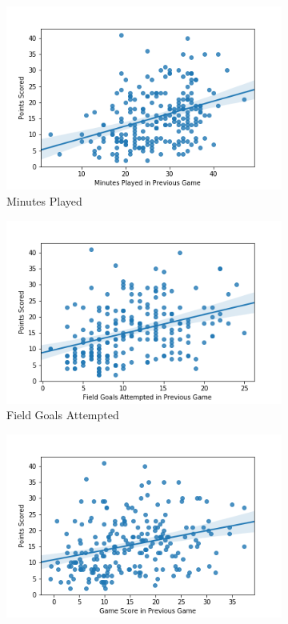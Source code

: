 \documentclass[a4paper,11pt,twoside]{article}
\begin{document}
\begin{figure} [h!]
\centering
  \begin{subfigure}[b]{0.47\textwidth}
    \includegraphics[width=\textwidth]{../mp_pts.png}
    \caption{Minutes Played}
    \label{fig:1}
  \end{subfigure}
  \begin{subfigure}[b]{0.47\textwidth}
    \includegraphics[width=\textwidth]{../fga_pts.png}
    \caption{Field Goals Attempted}
    \label{fig:2}
  \end{subfigure}
  \begin{subfigure}[b]{0.47\textwidth}
    \includegraphics[width=\textwidth]{../gmsc_pts.png}

\end{subfigure}
\end{figure}
\end{document}
